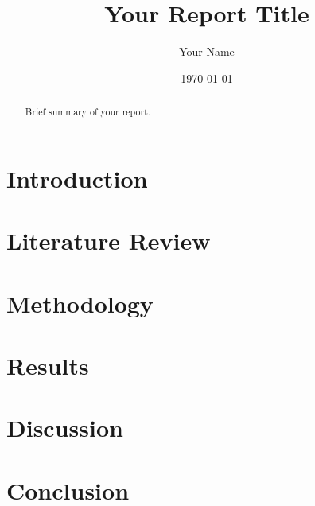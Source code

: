 \documentclass{article}
\title{Your Report Title}
\author{Your Name}
\date{\today}
\begin{document}
\maketitle

\begin{abstract}
    Brief summary of your report.
\end{abstract}

\tableofcontents

\section{Introduction}
    \lipsum[1]  %

\section{Literature Review}
    \lipsum[2]  %
    

\section{Methodology}
    \lipsum[3]  %

\section{Results}
    \lipsum[4]  %

\section{Discussion}
    \lipsum[5]  %

\section{Conclusion}
    \lipsum[6]  %

\printbibliography
\end{document}

